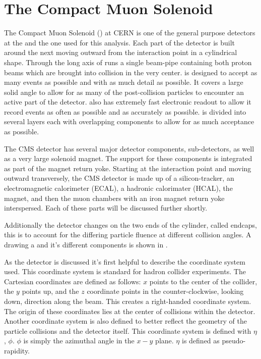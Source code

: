 \section{The Compact Muon Solenoid}
The Compact Muon Solenoid (\CMS) at CERN is one of the general purpose detectors at the \LHC and the one used for this analysis.  Each part of the detector is built around the next moving outward from the interaction point in a cylindrical shape.  Through the long axis of \CMS runs a single beam-pipe containing both proton beams which are brought into collision in the very center. \CMS is designed to accept as many events as possible and with as much detail as possible.  It covers a large solid angle to allow for as many of the post-collision particles to encounter an active part of the detector.  \CMS also has extremely fast electronic readout to allow it record events as often as possible and as accurately as possible.  \CMS is divided into several layers each with overlapping components to allow for as much acceptance as possible.

The CMS detector has several major detector components, sub-detectors, as well as a very large solenoid magnet.  The support for these components is integrated as part of the magnet return yoke.  Starting at the interaction point and moving outward transversely, the CMS detector is made up of a silicon-tracker, an electromagnetic calorimeter (ECAL), a hadronic calorimater (HCAL), the magnet, and then the muon chambers with an iron magnet return yoke interspersed.  Each of these parts will be discussed further shortly.

Additionally the detector changes on the two ends of the cylinder, called endcaps, this is to account for the differing particle fluence at different collision angles.  A drawing a \CMS and it's different components is shown in \cite{Sakuma_2014}.

As the \CMS detector is discussed it's first helpful to describe the coordinate system used.  This coordinate system is standard for hadron collider experiments.  The Cartesian coordinates are defined as follows: \ensuremath{x} points to the center of the collider, the \ensuremath{y} points up, and the \ensuremath{z} coordinate points in the counter-clockwise, looking down, direction along the beam.  This creates a right-handed coordinate system.  The origin of these coordinates lies at the center of collisions within the detector.  Another coordinate system is also defined to better reflect the geometry of the particle collisions and the detector itself.  This coordinate system is defined with \ensuremath{\eta}, \ensuremath{\phi}.  \ensuremath{\phi} is simply the azimuthal angle in the \ensuremath{x-y} plane.  \ensuremath{\eta} is defined as pseudo-rapidity.


